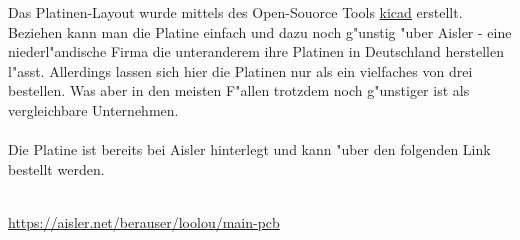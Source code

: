 Das Platinen-Layout wurde mittels des Open-Souorce Tools \href{http://kicad-pcb.org/}{kicad} erstellt. 
Beziehen kann man die Platine einfach und dazu noch g"unstig "uber Aisler - eine niederl"andische Firma die unteranderem ihre Platinen in Deutschland herstellen l"asst. Allerdings lassen sich hier die Platinen nur als ein vielfaches von drei bestellen. Was aber in den meisten F"allen trotzdem noch g"unstiger ist als vergleichbare Unternehmen. \\
\\
Die Platine ist bereits bei Aisler hinterlegt und kann "uber den folgenden Link bestellt werden. \\ \\
\begin{center}
\href{https://aisler.net/berauser/loolou/main-pcb}{https://aisler.net/berauser/loolou/main-pcb}
\end{center}


